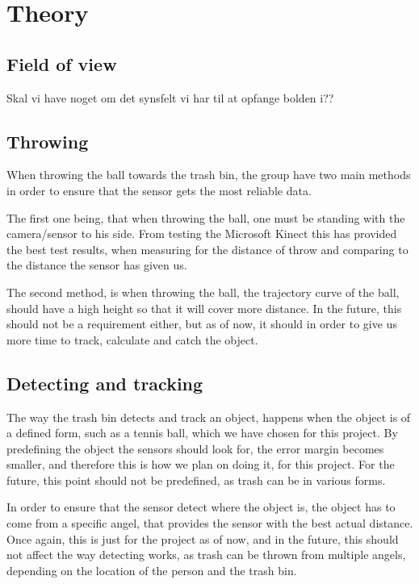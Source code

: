 \chapter{Theory}
\label{chap:Theory}

\section{Field of view}
\label{sec:Field of view}
Skal vi have noget om det synsfelt vi har til at opfange bolden i??

\section{Throwing}
\label{sec:ThrowingTheory}
When throwing the ball towards the trash bin, the group have two main methods in order to ensure that the sensor gets the most reliable data.

The first one being, that when throwing the ball, one must be standing with the camera/sensor to his side. From testing the Microsoft Kinect this has provided the best test results, when measuring for the distance of throw and comparing to the distance the sensor has given us.

The second method, is when throwing the ball, the trajectory curve of the ball, should have a high height so that it will cover more distance. In the future, this should not be a requirement either, but as of now, it should in order to give us more time to track, calculate and catch the object. 


\section{Detecting and tracking}
\label{sec:Detecting and trackingTheory}
The way the trash bin detects and track an object, happens when the object is of a defined form, such as a tennis ball, which we have chosen for this project. By predefining the object the sensors should look for, the error margin becomes smaller, and therefore this is how we plan on doing it, for this project. For the future, this point should not be predefined, as trash can be in various forms. 

In order to ensure that the sensor detect where the object is, the object has to come from a specific angel, that provides the sensor with the best actual distance. Once again, this is just for the project as of now, and in the future, this should not affect the way detecting works, as trash can be thrown from multiple angels, depending on the location of the person and the trash bin.


